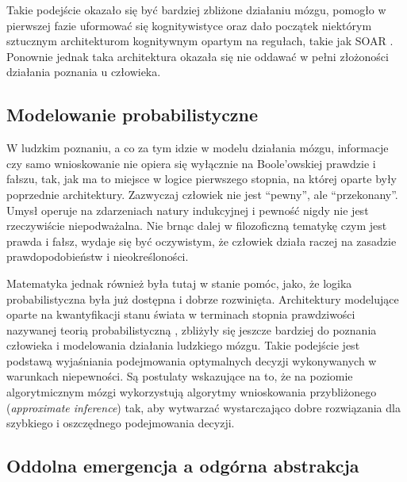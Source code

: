 Takie podejście okazało się być bardziej zbliżone działaniu mózgu, pomogło w pierwszej fazie uformować się kognitywistyce oraz dało początek niektórym sztucznym architekturom kognitywnym opartym na regułach, takie jak SOAR \cite{laird2019soar}\footnotemark.
Ponownie jednak taka architektura okazała się nie oddawać w pełni złożoności działania poznania u człowieka.

\subsection{Modelowanie probabilistyczne}

W ludzkim poznaniu, a co za tym idzie w modelu działania mózgu, informacje czy samo wnioskowanie nie opiera się wyłącznie na Boole'owskiej prawdzie i fałszu, tak, jak ma to miejsce w logice pierwszego stopnia, na której oparte były poprzednie architektury.
Zazwyczaj człowiek nie jest ``pewny'', ale ``przekonany''.
Umysł operuje na zdarzeniach natury indukcyjnej i pewność nigdy nie jest rzeczywiście niepodważalna.
Nie brnąc dalej w filozoficzną tematykę czym jest prawda i fałsz, wydaje się być oczywistym, że człowiek działa raczej na zasadzie prawdopodobieństw i nieokreśloności.

Matematyka jednak również była tutaj w stanie pomóc, jako, że logika probabilistyczna była już dostępna i dobrze rozwinięta.
Architektury modelujące oparte na kwantyfikacji stanu świata w terminach stopnia prawdziwości nazywanej teorią probabilistyczną \cite{jaynes1988does}, zbliżyły się jeszcze bardziej do poznania człowieka i modelowania działania ludzkiego mózgu.
Takie podejście jest podstawą wyjaśniania podejmowania optymalnych decyzji wykonywanych w warunkach niepewności.
Są postulaty wskazujące na to, że na poziomie algorytmicznym mózgi wykorzystują algorytmy wnioskowania przybliżonego (\emph{approximate inference}) \cite{andrieu2003introduction} tak, aby wytwarzać wystarczająco dobre rozwiązania dla szybkiego i oszczędnego podejmowania decyzji.

\subsection{Oddolna emergencja a odgórna abstrakcja}

